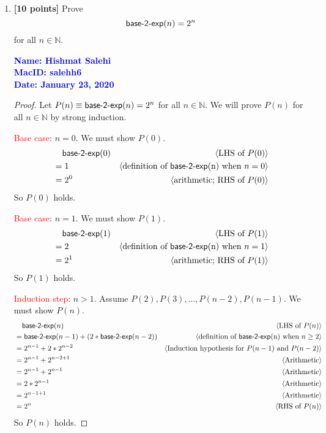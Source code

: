 \documentclass[11pt,fleqn]{article}
\newcommand{\mname}[1]{\mbox{\sf #1}}
\newcommand{\pnote}[1]{{\langle \text{#1} \rangle}}
\begin{document}
\begin{enumerate}
\begin{proof}
\medskip

Therefore, $P(n)$ holds for all $n \in \mathbb{N}$ by weak induction.
\end{proof}

  \bigskip

  \item \textbf{[10 points]} Prove \[\mname{base-2-exp}(n) = 2^n\] for
    all $n \in \mathbb{N}$.

  \bigskip

  \textcolor{blue}{\textbf{Name: Hishmat Salehi \\ MacID: salehh6 \\ Date: January 23, 2020}}

\begin{proof}
Let $P(n) \equiv \mname{base-2-exp}(n) = {2^n}$  for all $n \in \mathbb{N}$.  We will prove $P(n)$
for all $n \in \mathbb{N}$ by strong induction.

\medskip

\textcolor{red}{Base case}: $n = 0$.  We must show $P(0)$.
\begin{align*}
  &\phantom{{}=} \mname{base-2-exp}(0) & \pnote{LHS of $P(0)$}\\
  &= 1          & \pnote{definition of \mname{base-2-exp}(n) when $n = 0$}\\
  &= {2}^0    & \pnote{arithmetic; RHS of $P(0)$}
\end{align*}
So $P(0)$ holds.

\medskip

\textcolor{red}{Base case}: $n = 1$.  We must show $P(1)$.
\begin{align*}
  &\phantom{{}=} \mname{base-2-exp}(1) & \pnote{LHS of $P(1)$}\\
  &= 2         & \pnote{definition of \mname{base-2-exp}(n) when $n = 1$}\\
  &= {2}^1    & \pnote{arithmetic; RHS of $P(1)$}
\end{align*}
So $P(1)$ holds.

\medskip

\textcolor{red}{Induction step}: $n > 1$. Assume $P(2), P(3), ... , P(n-2), P(n-1)$. We must show $P(n)$.
\begin{align*}
  &\phantom{{}=} \mname{base-2-exp}(n)   & \pnote{LHS of $P(n)$}\\
  &= \mname{base-2-exp}(n-1) + (2 * \mname{base-2-exp}(n-2))  & \pnote{definition of \mname{base-2-exp}(n) when $n \ge 2$}\\
  &={2}^{n-1} + 2 * {2}^{n-2}  & \pnote{Induction hypothesis for $P(n-1)$ and $P(n-2)$}\\
  &={2}^{n-1} + {2}^{n-2+1}  & \pnote{Arithmetic}\\
  &={2}^{n-1} + {2}^{n-1}  & \pnote{Arithmetic}\\
  &=2*{2}^{n-1}  & \pnote{Arithmetic}\\
  &={2}^{n-1+1}  & \pnote{Arithmetic}\\
  &= {2}^n & \pnote{RHS of $P(n)$}\\
\end{align*}
So $P(n)$ holds.


\end{proof}
\end{enumerate}
\end{document}
